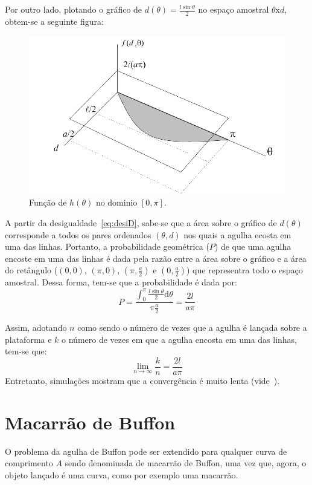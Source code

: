 \documentclass [a4paper,10pt]{article}
\begin{document}
    Por outro lado, plotando o gráfico de $d(\theta) = \frac{l\sin\theta}{2}$ no espaço amostral 
    $\theta \mathrm{x} d$, obtem-se a seguinte figura:
    \begin{figure}[!ht]
      \centering
      \includegraphics[scale=0.5]{Grafico_h.png}
      \caption{Função de $h(\theta)$ no dominio $[0, \pi]$.\label{fig:graficoH}}
    \end{figure}
   
    A partir da desigualdade~\eqref{eq:desiD}, sabe-se que a área sobre o gráfico de $d(\theta)$ corresponde a todos
    os pares ordenados $(\theta, d)$ nos quais a agulha ecosta em uma das linhas. Portanto, a probabilidade 
    geométrica ($P$) de que uma agulha encoste em uma das linhas é dada pela razão 
    entre a área sobre o gráfico e a área do
    retângulo ($(0,0)$, $(\pi, 0)$, $(\pi, \frac{a}{2})$ e $(0, \frac{a}{2})$) que representra todo o espaço amostral.
    Dessa forma, tem-se que a probabilidade é dada por:
    \begin{equation}\label{eq:prob}
      P = \frac{\int_0^{\pi}\frac{l\sin\theta}{2}\mathrm{d}\theta}{\pi\frac{a}{2}} = \frac{2l}{a\pi}
    \end{equation}
    
    Assim, adotando $n$ como sendo o número de vezes que a agulha é lançada sobre a plataforma e $k$ o número de vezes
    em que a agulha encosta em uma das linhas, tem-se que:
    \begin{equation}\label{eq:prob2}
      \lim_{n \to \infty} \frac{k}{n} = \frac{2l}{a\pi}
    \end{equation}
    Entretanto, simulações mostram que a convergência é muito lenta (vide~\cite{referencia}).  
    
    \section{Macarrão de Bu{f}fon}
      O problema da agulha de Buf{f}on pode ser extendido para qualquer curva de comprimento $A$
      sendo denominada de macarrão de Buf{f}on, uma vez que, agora, o objeto lançado é uma curva, como
      por exemplo uma macarrão.
      
\end{document}
